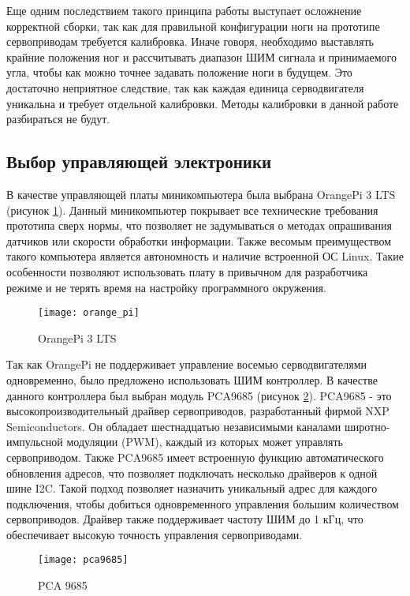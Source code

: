 Еще одним последствием такого принципа работы выступает осложнение корректной сборки, так как для правильной конфигурации ноги на прототипе сервоприводам требуется калибровка. Иначе говоря, необходимо выставлять крайние положения ног и рассчитывать диапазон ШИМ сигнала и принимаемого угла, чтобы как можно точнее задавать положение ноги в будущем. Это достаточно неприятное следствие, так как каждая единица серводвигателя уникальна и требует отдельной калибровки. Методы калибровки в данной работе разбираться не будут.

\subsection{Выбор управляющей электроники}\label{C4_4_2}
	
В качестве управляющей платы миникомпьютера была выбрана OrangePi 3 LTS (рисунок \ref{orange_pi}). Данный миникомпьютер покрывает все технические требования прототипа сверх нормы, что позволяет не задумываться о методах опрашивания датчиков или скорости обработки информации. Также весомым преимуществом такого компьютера является автономность и наличие встроенной ОС Linux. Такие особенности позволяют использовать плату в привычном для разработчика режиме и не терять время на настройку программного окружения. 	
\begin{figure}[h!]
	\begin{center}
		\texttt{[image: orange\_pi]}
		\caption{OrangePi 3 LTS}
		\label{orange_pi}
	\end{center}
\end{figure}

Так как OrangePi не поддерживает управление восемью серводвигателями одновременно, было предложено использовать ШИМ контроллер. В качестве данного контроллера был выбран модуль PCA9685 (рисунок \ref{pca9685}). PCA9685 - это высокопроизводительный драйвер сервоприводов, разработанный фирмой NXP Semiconductors. Он обладает шестнадцатью независимыми каналами широтно-импульсной модуляции (PWM), каждый из которых может управлять сервоприводом. Также PCA9685 имеет встроенную функцию автоматического обновления адресов, что позволяет подключать несколько драйверов к одной шине I2C. Такой подход позволяет назначить уникальный адрес для каждого подключения, чтобы добиться одновременного управления большим количеством сервоприводов. Драйвер также поддерживает частоту ШИМ до 1 кГц, что обеспечивает высокую точность управления сервоприводами.
\newpage
\begin{figure}[h!]
	\begin{center}
		\texttt{[image: pca9685]}
		\caption{PCA 9685}
		\label{pca9685}
	\end{center}
\end{figure}

